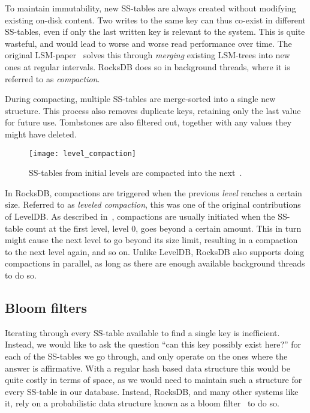 To maintain immutability, new SS-tables are always created without modifying
existing on-disk content. Two writes to the same key can thus co-exist in
different SS-tables, even if only the last written key is relevant to the
system. This is quite wasteful, and would lead to worse and worse read
performance over time. The original LSM-paper~\cite{lsm} solves this through
\textit{merging} existing LSM-trees into new ones at regular intervals. RocksDB
does so in background threads, where it is referred to as \textit{compaction}.

During compacting, multiple SS-tables are merge-sorted into a single new
structure. This process also removes duplicate keys, retaining only the last
value for future use. Tombstones are also filtered out, together with any values
they might have deleted.

\begin{figure}[H]
  \centering
  \texttt{[image: level\_compaction]}
  \caption{SS-tables from initial levels are compacted into the next~\cite{rocksdb-compaction}.}
\end{figure}

In RocksDB, compactions are triggered when the previous \textit{level} reaches a
certain size. Referred to as \textit{leveled compaction}, this was one of the
original contributions of LevelDB\@. As described in~\cite{rocksdb-compaction},
compactions are usually initiated when the SS-table count at the first level,
level 0, goes beyond a certain amount. This in turn might cause the next level
to go beyond its size limit, resulting in a compaction to the next level again,
and so on. Unlike LevelDB, RocksDB also supports doing compactions in parallel,
as long as there are enough available background threads to do so.

\subsection{Bloom filters}\label{sec:bloom}

Iterating through every SS-table available to find a single key is inefficient.
Instead, we would like to ask the question ``can this key possibly exist here?''
for each of the SS-tables we go through, and only operate on the ones where the
answer is affirmative. With a regular hash based data structure this would be
quite costly in terms of space, as we would need to maintain such a structure
for every SS-table in our database. Instead, RocksDB, and many other systems
like it, rely on a probabilistic data structure known as a bloom
filter~\cite{bloom} to do so.

